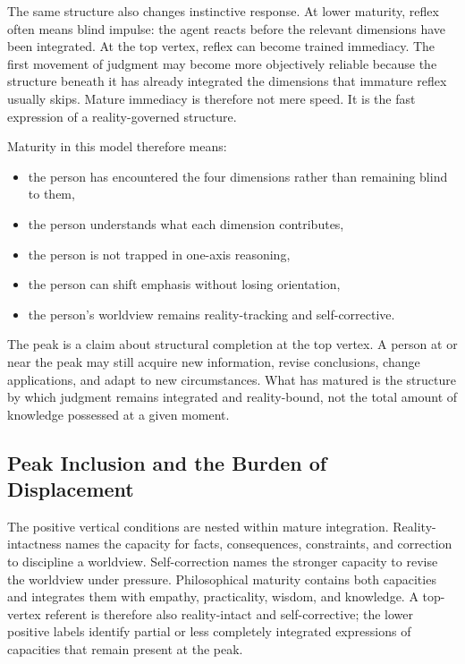 \documentclass[11pt]{article}
\begin{document}
The same structure also changes instinctive response. At lower maturity, reflex often means blind impulse: the agent reacts before the relevant dimensions have been integrated. At the top vertex, reflex can become trained immediacy. The first movement of judgment may become more objectively reliable because the structure beneath it has already integrated the dimensions that immature reflex usually skips. Mature immediacy is therefore not mere speed. It is the fast expression of a reality-governed structure.

Maturity in this model therefore means:

\begin{itemize}
    \item the person has encountered the four dimensions rather than remaining blind to them,
    \item the person understands what each dimension contributes,
    \item the person is not trapped in one-axis reasoning,
    \item the person can shift emphasis without losing orientation,
    \item the person's worldview remains reality-tracking and self-corrective.
\end{itemize}

The peak is a claim about structural completion at the top vertex. A person at or near the peak may still acquire new information, revise conclusions, change applications, and adapt to new circumstances. What has matured is the structure by which judgment remains integrated and reality-bound, not the total amount of knowledge possessed at a given moment.

\subsection{Peak Inclusion and the Burden of Displacement}

The positive vertical conditions are nested within mature integration. Reality-intactness names the capacity for facts, consequences, constraints, and correction to discipline a worldview. Self-correction names the stronger capacity to revise the worldview under pressure. Philosophical maturity contains both capacities and integrates them with empathy, practicality, wisdom, and knowledge. A top-vertex referent is therefore also reality-intact and self-corrective; the lower positive labels identify partial or less completely integrated expressions of capacities that remain present at the peak.
\end{document}
